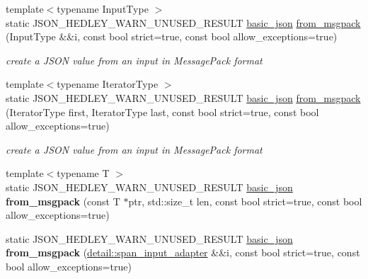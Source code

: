 \begin{DoxyCompactItemize}
\item 
{\footnotesize template$<$typename Input\+Type $>$ }\\static J\+S\+O\+N\+\_\+\+H\+E\+D\+L\+E\+Y\+\_\+\+W\+A\+R\+N\+\_\+\+U\+N\+U\+S\+E\+D\+\_\+\+R\+E\+S\+U\+LT \hyperlink{classnlohmann_1_1basic__json}{basic\+\_\+json} \hyperlink{classnlohmann_1_1basic__json_adbcab52fca1e25b3311ef14e71a57590}{from\+\_\+msgpack} (Input\+Type \&\&i, const bool strict=true, const bool allow\+\_\+exceptions=true)
\begin{DoxyCompactList}\small\item\em create a J\+S\+ON value from an input in Message\+Pack format \end{DoxyCompactList}\item 
{\footnotesize template$<$typename Iterator\+Type $>$ }\\static J\+S\+O\+N\+\_\+\+H\+E\+D\+L\+E\+Y\+\_\+\+W\+A\+R\+N\+\_\+\+U\+N\+U\+S\+E\+D\+\_\+\+R\+E\+S\+U\+LT \hyperlink{classnlohmann_1_1basic__json}{basic\+\_\+json} \hyperlink{classnlohmann_1_1basic__json_a94dbeb08bcd13821512957dcbf3f00bd}{from\+\_\+msgpack} (Iterator\+Type first, Iterator\+Type last, const bool strict=true, const bool allow\+\_\+exceptions=true)
\begin{DoxyCompactList}\small\item\em create a J\+S\+ON value from an input in Message\+Pack format \end{DoxyCompactList}\item 
\mbox{\label{classnlohmann_1_1basic__json_a0d69d3102639759d5202a6f764760d23}} 
{\footnotesize template$<$typename T $>$ }\\static J\+S\+O\+N\+\_\+\+H\+E\+D\+L\+E\+Y\+\_\+\+W\+A\+R\+N\+\_\+\+U\+N\+U\+S\+E\+D\+\_\+\+R\+E\+S\+U\+LT \hyperlink{classnlohmann_1_1basic__json}{basic\+\_\+json} {\bfseries from\+\_\+msgpack} (const T $\ast$ptr, std\+::size\+\_\+t len, const bool strict=true, const bool allow\+\_\+exceptions=true)
\item 
\mbox{\label{classnlohmann_1_1basic__json_a84b3d89de8e774a2609dc4c0a1273f62}} 
static J\+S\+O\+N\+\_\+\+H\+E\+D\+L\+E\+Y\+\_\+\+W\+A\+R\+N\+\_\+\+U\+N\+U\+S\+E\+D\+\_\+\+R\+E\+S\+U\+LT \hyperlink{classnlohmann_1_1basic__json}{basic\+\_\+json} {\bfseries from\+\_\+msgpack} (\hyperlink{classnlohmann_1_1detail_1_1span__input__adapter}{detail\+::span\+\_\+input\+\_\+adapter} \&\&i, const bool strict=true, const bool allow\+\_\+exceptions=true)

\end{DoxyCompactItemize}

